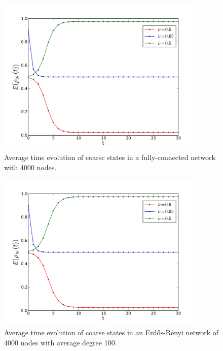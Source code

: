 \documentclass[]{article}
\begin{document}
\begin{figure}


\includegraphics[width=0.9\textwidth]{time_evolution_fully_M1000_N4000.pdf}
\caption{Average time evolution of coarse states in a fully-connected network with 4000 nodes.}
\label{fig:time_evolution}
\end{figure}


\begin{figure}
\includegraphics[width=0.9\textwidth]{time_evolution_random_M1000_N4000.pdf}
\caption{Average time evolution of coarse states in an Erd\H{o}s-Rényi network of 4000 nodes with average degree 100.}
\label{fig:time_evolution_erdos}
\end{figure}
\end{document}
